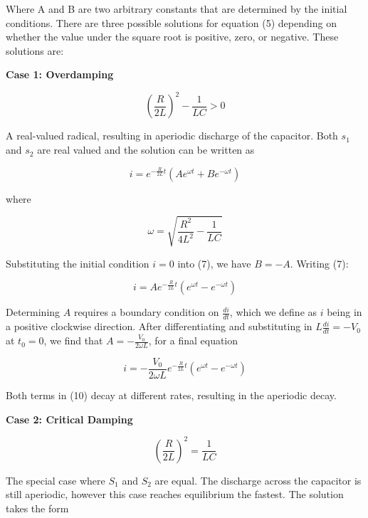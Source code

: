 \documentclass[twocolumn, letterpaper, 10pt, twoside]{article}
\begin{document}
 Where A and B are two arbitrary constants that are determined by the initial conditions. There are three possible solutions for equation (5) depending on whether the value under the square root is positive, zero, or negative. These solutions are: 
 
 \textbf{{Case 1:} Overdamping}
 
\begin{equation}
(\frac{R}{2L})^2 - \frac{1}{LC} > 0 
\end{equation}

A real-valued radical, resulting in aperiodic discharge of the capacitor. Both $s_1$ and $s_2$ are real valued and the solution can be written as

   \begin{equation}
i = e^{-\frac{R}{2L}t}(Ae^{\omega t} + Be^{-\omega t})
\end{equation}

where

   \begin{equation}
\omega = \sqrt{\frac{R^2}{4L^2} - \frac{1}{LC}}
\end{equation}
  
  Substituting the initial condition $i = 0$ into (7), we have $B = -A$. Writing (7):
  
 \begin{equation}
  i = Ae^{-\frac{R}{2L}t}(e^{\omega t} - e^{-\omega t})
 \end{equation}
  
  Determining $A$ requires a boundary condition on $\frac{di}{dt}$, which we define as $i$ being in a positive clockwise direction. After differentiating and substituting in $L\frac{di}{dt} = -V_0$ at $t_0 = 0$, we find that $A = -\frac{V_0}{2\omega L}$, for a final equation 
  
  \begin{equation}
  i = -\frac{V_0}{2\omega L}e^{-\frac{R}{2L}t}(e^{\omega t} - e^{-\omega t})
  \end{equation}
  
  Both terms in  (10) decay at different rates, resulting in the aperiodic decay.
  
\textbf{{Case 2:} Critical Damping}

\begin{equation}
(\frac{R}{2L})^2 = \frac{1}{LC}
\end{equation}

The special case where $S_1$ and $S_2$ are equal. The discharge across the capacitor is still aperiodic, however this case reaches equilibrium the fastest. The solution takes the form
\end{document}
